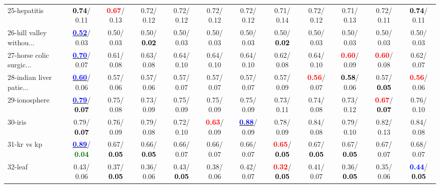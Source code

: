\begin{table}[h]
\begin{center}
{\begin{tabular}{lc|c|c|c|c|c|c|c|c|c|c}
25-hepatitis & \textcolor{black}{\textbf{  0.74}}/  0.11 & \textcolor{red}{\textbf{  0.67}}/  0.13 &   0.72/  0.12 &   0.72/  0.12 &   0.72/  0.12 &   0.72/  0.12 &   0.71/  0.14 &   0.72/  0.12 &   0.71/  0.13 &   0.72/  0.11 & \textcolor{black}{\textbf{  0.74}}/  0.11 \\
26-hill valley withou... & \underline{\textcolor{blue}{\textbf{  0.52}}}/  0.03 &   0.50/  0.03 &   0.50/\textcolor{black}{\textbf{  0.02}} &   0.50/  0.03 &   0.50/  0.03 &   0.50/  0.03 &   0.50/\textcolor{black}{\textbf{  0.02}} &   0.50/  0.03 &   0.50/  0.03 &   0.50/  0.03 &   0.50/  0.03 \\
27-horse colic surgic... & \underline{\textcolor{blue}{\textbf{  0.70}}}/  0.07 &   0.61/  0.08 &   0.63/  0.08 &   0.64/  0.10 &   0.64/  0.10 &   0.64/  0.10 &   0.62/  0.08 &   0.64/  0.10 & \textcolor{red}{\textbf{  0.60}}/  0.09 & \textcolor{red}{\textbf{  0.60}}/  0.08 &   0.62/  0.07 \\
28-indian liver patie... & \underline{\textcolor{blue}{\textbf{  0.60}}}/  0.06 &   0.57/  0.06 &   0.57/  0.06 &   0.57/  0.07 &   0.57/  0.07 &   0.57/  0.07 &   0.57/  0.09 & \textcolor{red}{\textbf{  0.56}}/  0.07 & \textcolor{black}{\textbf{  0.58}}/  0.06 &   0.57/\textcolor{black}{\textbf{  0.05}} & \textcolor{red}{\textbf{  0.56}}/  0.06 \\ \hline
29-ionosphere & \underline{\textcolor{blue}{\textbf{  0.79}}}/\textcolor{black}{\textbf{  0.07}} &   0.75/  0.08 &   0.73/  0.09 &   0.75/  0.09 &   0.75/  0.09 &   0.75/  0.09 &   0.73/  0.11 &   0.74/  0.08 &   0.73/  0.12 & \textcolor{red}{\textbf{  0.67}}/\textcolor{black}{\textbf{  0.07}} &   0.76/  0.10 \\
30-iris &   0.79/\textcolor{black}{\textbf{  0.07}} &   0.76/  0.09 &   0.79/  0.08 &   0.72/  0.10 & \textcolor{red}{\textbf{  0.63}}/  0.09 & \underline{\textcolor{blue}{\textbf{  0.88}}}/  0.09 &   0.78/  0.09 &   0.84/  0.08 &   0.79/  0.10 &   0.82/  0.13 &   0.84/  0.08 \\
31-kr vs kp & \underline{\textcolor{blue}{\textbf{  0.89}}}/\textcolor{darkgreen}{\textbf{  0.04}} &   0.67/\textcolor{black}{\textbf{  0.05}} &   0.66/\textcolor{black}{\textbf{  0.05}} &   0.66/  0.07 &   0.66/  0.07 &   0.66/  0.07 & \textcolor{red}{\textbf{  0.65}}/\textcolor{black}{\textbf{  0.05}} &   0.67/\textcolor{black}{\textbf{  0.05}} &   0.67/\textcolor{black}{\textbf{  0.05}} &   0.67/  0.07 &   0.68/  0.07 \\
32-leaf &   0.43/  0.06 &   0.37/\textcolor{black}{\textbf{  0.05}} &   0.36/  0.06 &   0.43/\textcolor{black}{\textbf{  0.05}} &   0.38/  0.06 &   0.42/  0.07 & \textcolor{red}{\textbf{  0.32}}/\textcolor{black}{\textbf{  0.05}} &   0.41/  0.07 &   0.36/\textcolor{black}{\textbf{  0.05}} &   0.35/  0.06 & \textcolor{blue}{\textbf{  0.44}}/\textcolor{black}{\textbf{  0.05}} \\\end{tabular}}\label{stratsBalAcc0aCIELM}
\end{center}
\end{table}
